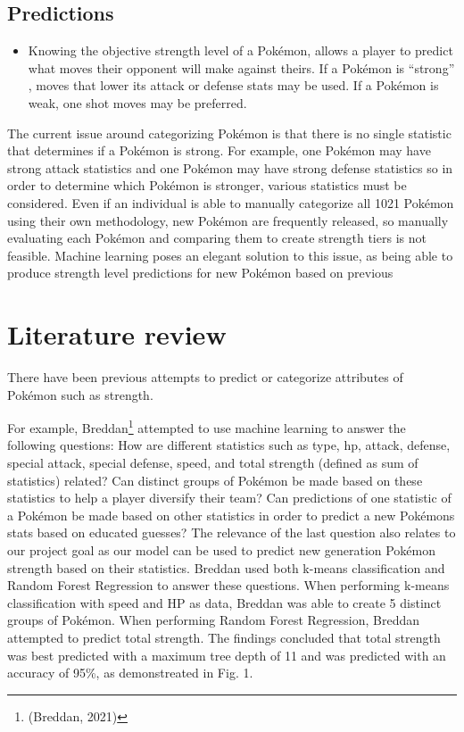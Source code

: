 \documentclass[conference]{IEEEtran}
\begin{document}
\subsection{Predictions}\label{AA}
\begin{itemize}
    \item Knowing the objective strength level of a Pokémon, allows a player to predict what moves their opponent will make against theirs. If a Pokémon is “strong” , moves that lower its attack or defense stats may be used. If a Pokémon is weak, one shot moves may be preferred.
\end{itemize}

The current issue around categorizing Pokémon is that there is no single statistic that determines if a Pokémon is strong. For example, one Pokémon may have strong attack statistics and one Pokémon may have strong defense statistics so in order to determine which Pokémon is stronger, various statistics must be considered. Even if an individual is able to manually categorize all 1021 Pokémon using their own methodology, new Pokémon are frequently released, so manually evaluating each Pokémon and comparing them to create strength tiers is not feasible. Machine learning poses an elegant solution to this issue, as being able to produce strength level predictions for new Pokémon based on previous 


\section{Literature review}
There have been previous attempts to predict or categorize attributes of Pokémon such as strength.

For example, Breddan\footnote{(Breddan, 2021)} attempted to use machine learning to answer the following questions: How are different statistics such as type, hp, attack, defense, special attack, special defense, speed, and total strength (defined as sum of statistics)  related? Can distinct groups of Pokémon be made based on these statistics to help a player diversify their team? Can predictions of one statistic of a Pokémon be made based on other statistics in order to predict a new Pokémons stats based on educated guesses? The relevance of the last question also relates to our project goal as our model can be used to predict new generation Pokémon strength based on their statistics. Breddan used both k-means classification and Random Forest Regression to answer these questions. When performing k-means classification with speed and HP as data, Breddan was able to create 5 distinct groups of Pokémon. When performing Random Forest Regression, Breddan attempted to predict total strength. The findings concluded that total strength was best predicted with a maximum tree depth of 11 and was predicted with an accuracy of 95\%, as demonstreated in Fig. 1.
\end{document}
